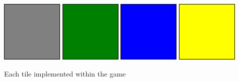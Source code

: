 \documentclass[a4paper,12pt]{extarticle}
\begin{document}
\begin{center}
\includegraphics[scale=1]{greyTile.png}
\hspace{1mm}
\includegraphics[scale=1]{greenTile.png}
\hspace{1mm}
\includegraphics[scale=1]{blueTile.png}
\hspace{1mm}
\includegraphics[scale=1]{yellowTile.png}
\hspace{1mm}

Each tile implemented within the game
\end{center}
\end{document}
